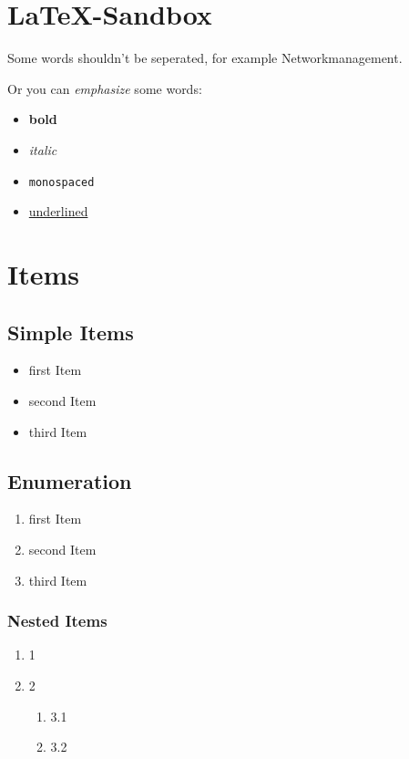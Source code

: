 \chapter{\LaTeX-Sandbox}

Some words shouldn't be seperated, for example Net\-work\-manage\-ment.



Or you can \emph{emphasize} some words:
\begin{itemize}
	\item \textbf{bold}
	\item \textit{italic}
	\item \texttt{monospaced}
	\item \underline{underlined}
\end{itemize}

\chapter{Items}

\section{Simple Items}
\begin{itemize}
	\item first Item
	\item second Item
	\item third Item
\end{itemize}

\section{Enumeration}
\begin{enumerate}
	\item first Item
	\item second Item
	\item third Item
\end{enumerate}

\subsection{Nested Items}
\begin{enumerate}
	\item 1
	\item 2
	\begin{enumerate}
		\item 3.1
		\item 3.2
\end{enumerate}
\end{enumerate}

